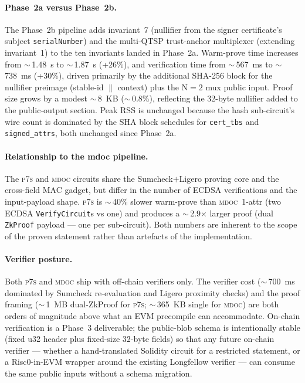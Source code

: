 \paragraph{Phase~2a versus Phase~2b.}
The Phase~2b pipeline adds invariant~7 (nullifier from the signer certificate's subject \texttt{serialNumber}) and the multi-QTSP trust-anchor multiplexer (extending invariant~1) to the ten invariants landed in Phase~2a.
Warm-prove time increases from ${\sim}\,$1.48~s to ${\sim}\,$1.87~s (+26\%), and verification time from ${\sim}\,$567~ms to ${\sim}\,$738~ms (+30\%), driven primarily by the additional SHA-256 block for the nullifier preimage (stable-id $\parallel$ context) plus the N${=}2$ mux public input.
Proof size grows by a modest ${\sim}\,$8~KB (${\sim}\,$0.8\%), reflecting the 32-byte nullifier added to the public-output section.
Peak RSS is unchanged because the hash sub-circuit's wire count is dominated by the SHA block schedules for \texttt{cert\_tbs} and \texttt{signed\_attrs}, both unchanged since Phase~2a.

\paragraph{Relationship to the mdoc pipeline.}
The \textsc{p7s} and \textsc{mdoc} circuits share the Sumcheck$+$Ligero proving core and the cross-field MAC gadget, but differ in the number of ECDSA verifications and the input-payload shape.
\textsc{p7s} is ${\sim}\,$40\% slower warm-prove than \textsc{mdoc}~1-attr (two ECDSA \texttt{VerifyCircuit}{s} vs one) and produces a ${\sim}\,$2.9$\times$ larger proof (dual \texttt{ZkProof} payload --- one per sub-circuit).
Both numbers are inherent to the scope of the proven statement rather than artefacts of the implementation.

\paragraph{Verifier posture.}
Both \textsc{p7s} and \textsc{mdoc} ship with off-chain verifiers only.
The verifier cost (${\sim}\,$700~ms dominated by Sumcheck re-evaluation and Ligero proximity checks) and the proof framing (${\sim}\,$1~MB dual-ZkProof for \textsc{p7s}; ${\sim}\,$365~KB single for \textsc{mdoc}) are both orders of magnitude above what an EVM precompile can accommodate.
On-chain verification is a Phase~3 deliverable; the public-blob schema is intentionally stable (fixed u32 header plus fixed-size 32-byte fields) so that any future on-chain verifier --- whether a hand-translated Solidity circuit for a restricted statement, or a Risc0-in-EVM wrapper around the existing Longfellow verifier --- can consume the same public inputs without a schema migration.

